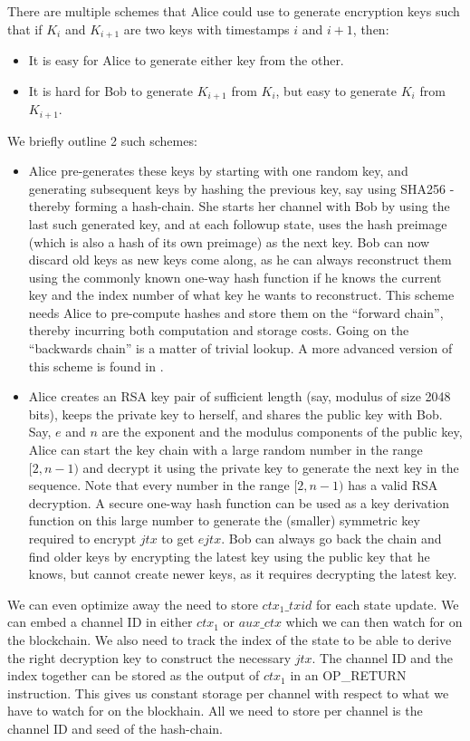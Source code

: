 There are multiple schemes that Alice could use to generate encryption keys such that if $K_i$ and $K_{i+1}$ are two keys with timestamps $\mathit{i}$ and $i+1$, then:
\begin{itemize}
\item It is easy for Alice to generate either key from the other.
\item It is hard for Bob to generate $K_{i+1}$ from $K_i$, but easy to generate $K_i$ from $K_{i+1}$. 
\end{itemize}
We briefly outline 2 such schemes:
\begin{itemize}
    \item Alice pre-generates these keys by starting with one random key, and generating subsequent keys by hashing the previous key, say using SHA256 - thereby forming a hash-chain. She starts her channel with Bob by using the last such generated key, and at each followup state, uses the hash preimage (which is also a hash of its own preimage) as the next key. Bob can now discard old keys as new keys come along, as he can always reconstruct them using the commonly known one-way hash function if he knows the current key and the index number of what key he wants to reconstruct. This scheme needs Alice to pre-compute hashes and store them on the ``forward chain'', thereby incurring both computation and storage costs. Going on the ``backwards chain'' is a matter of trivial lookup. A more advanced version of this scheme is found in \cite{shachain}.
    \item Alice creates an RSA key pair of sufficient length (say, modulus of size 2048 bits), keeps the private key to herself, and shares the public key with Bob. Say, $\mathit{e}$ and $\mathit{n}$ are the exponent and the modulus components of the public key, Alice can start the key chain with a large random number in the range $\mathit{[2, n-1)}$ and decrypt it using the private key to generate the next key in the sequence. Note that every number in the range $\mathit{[2, n-1)}$ has a valid RSA decryption. A secure one-way hash function can be used as a key derivation function on this large number to generate the (smaller) symmetric key required to encrypt $\mathit{jtx}$ to get $\mathit{ejtx}$. Bob can always go back the chain and find older keys by encrypting the latest key using the public key that he knows, but cannot create newer keys, as it requires decrypting the latest key.
\end{itemize}

We can even optimize away the need to store $\mathit{ctx_1\_txid}$ for each state update. We can embed a channel ID in either $\mathit{ctx_1}$ or $\mathit{aux\_ctx}$ which we can then watch for on the blockchain. We also need to track the index of the state to be able to derive the right decryption key to construct the necessary $\mathit{jtx}$. The channel ID and the index together can be stored as the  output of $\mathit{ctx_1}$ in an OP\_RETURN instruction. This gives us constant storage per channel with respect to what we have to watch for on the blockhain. All we need to store per channel is the channel ID and seed of the hash-chain. 

